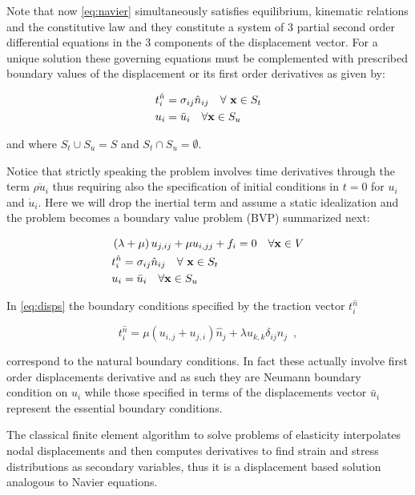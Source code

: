Note that now \cref{eq:navier} simultaneously satisfies equilibrium, kinematic relations and the constitutive law and they constitute a system of 3 partial second order differential equations in the 3 components of the displacement vector. For a unique solution these governing equations must be complemented with prescribed boundary values of the  displacement or its first order derivatives as given by:
 
\begin{equation}\label{eq:Wellbcs}
\begin{split}
&t_i^{\hat n} = \sigma _{ij} \hat n_{ij} \quad \forall\ \vb{x} \in S_t\\
& {u_i} = \bar{u}_i \quad \forall \vb x \in S_u
\end{split}
\end{equation}

and where ${S_t} \cup {S_u} = S$ and ${S_t} \cap {S_u} = \emptyset $. 

Notice that strictly speaking the problem involves time derivatives through the term $\rho \ddot{u}_i$ thus requiring also the specification of initial conditions in $t = 0$ for $u_i$ and $\dot{u}_i$. Here we will drop the inertial term and assume a static idealization and the problem becomes a boundary value problem (BVP) summarized next:


\begin{equation}
\begin{split}
&\left(\lambda  + \mu \right)u_{j,ij} + \mu u_{i,jj} + {f_i} = 0 \quad \forall \vb{x} \in V \\
&t_i^{\hat n} = \sigma _{ij} \hat n_{ij} \quad \forall\ \vb{x} \in S_t\\
& {u_i} = \bar{u}_i \quad \forall \vb x \in S_u
\end{split}
\label{eq:disps}
\end{equation}


In \ref{eq:disps} the boundary conditions specified by the traction vector $t_i^{\hat n}$


\[t_i^{\hat n} = \mu (u_{i,j} + u_{j,i}) \hat{n}_j + \lambda u_{k,k} \delta_{ij}\hat{n}_j \enspace ,\]

correspond to the natural boundary conditions. In fact these actually involve first order displacements derivative and as such they are Neumann boundary condition on $u_i$ while those specified in terms of the displacements vector $\bar u_i$ represent the essential boundary conditions.


\begin{tcolorbox}
The classical finite element algorithm to solve problems of elasticity interpolates nodal displacements and then computes derivatives to find strain and stress distributions as secondary variables, thus it is a displacement based solution analogous to Navier equations.
\end{tcolorbox}

